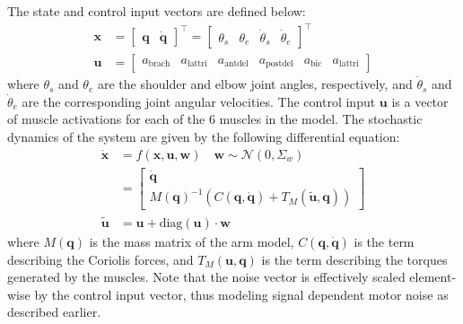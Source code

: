 \documentclass[letterpaper, 10pt, conference]{ieeeconf}
\begin{document}
The state and control input vectors are defined below:
\begin{align}
    \mathbf{x} &= \begin{bmatrix}
        \mathbf{q} &
        \dot{\mathbf{q}}
    \end{bmatrix}^\top = \begin{bmatrix}
        \theta_s &
        \theta_e &
        \dot{\theta}_s &
        \dot{\theta}_e
    \end{bmatrix}^\top \\
    \mathbf{u} &= \begin{bmatrix}
        a_{\text{brach}} & a_{\text{lattri}} & a_{\text{antdel}} & a_{\text{postdel}} & a_{\text{bic}} & a_{\text{lattri}}
    \end{bmatrix}
\end{align}
where $\theta_s$ and $\theta_e$ are the shoulder and elbow joint angles, respectively, and $\dot{\theta}_s$ and $\dot{\theta}_e$ are the corresponding joint angular velocities. The control input $\mathbf{u}$ is a vector of muscle activations for each of the 6 muscles in the model. The stochastic dynamics of the system are given by the following differential equation:
\begin{align}
    \dot{\mathbf{x}} &= f(\mathbf{x}, \mathbf{u}, \mathbf{w}) \quad \mathbf{w} \sim \mathcal{N}(0, \Sigma_w) \\
    &= \begin{bmatrix}
        \dot{\mathbf{q}} \\
        M(\mathbf{q})^{-1} \left(C(\mathbf{q}, \dot{\mathbf{q}}) + T_M(\tilde{\mathbf{u}}, \mathbf{q})\right)
    \end{bmatrix} \\
    \tilde{\mathbf{u}} &= \mathbf{u} + \text{diag}(\mathbf{u}) \cdot \mathbf{w}
\end{align}
where $M(\mathbf{q})$ is the mass matrix of the arm model, $C(\mathbf{q}, \dot{\mathbf{q}})$ is the term describing the Coriolis forces, and $T_M(\mathbf{u}, \mathbf{q})$ is the term describing the torques generated by the muscles.
Note that the noise vector is effectively scaled element-wise by the control input vector, thus modeling signal dependent motor noise as described earlier.
\end{document}
